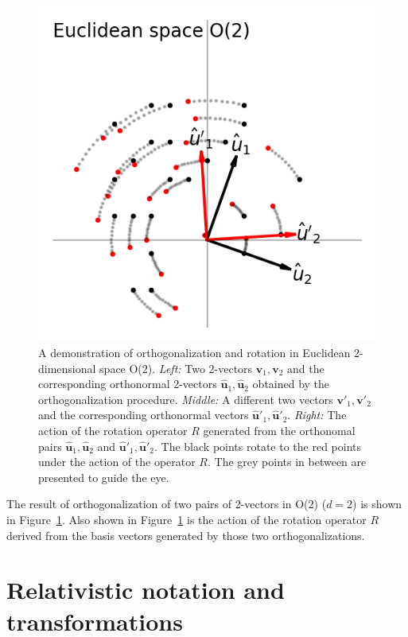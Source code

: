 \documentclass{article}
\newcommand{\Evec}[1]{{\mathbf{#1}}} %
\newcommand{\Ehat}[1]{{\mathbf{\hat{#1}}}} %
\newcommand{\figref}[1]{Figure~\ref{#1}}
\newlength{\figurewidth}
\begin{document}
\begin{figure}[t]
\begin{mdframed}
\includegraphics[width=\figurewidth]{E_Q.png}
\caption{A demonstration of orthogonalization and rotation in Euclidean 2-dimensional space O($2$).
    \textsl{Left:} Two 2-vectors $\Evec{v}_1, \Evec{v}_2$ and the corresponding orthonormal 2-vectors $\Ehat{u}_1, \Ehat{u}_2$ obtained by the orthogonalization procedure.
\textsl{Middle:} A different two vectors $\Evec{v}'_1, \Evec{v}'_2$ and the corresponding orthonormal vectors $\Ehat{u}'_1, \Ehat{u}'_2$.
\textsl{Right:} The action of the rotation operator $R$ generated from the orthonomal pairs $\Ehat{u}_1, \Ehat{u}_2$ and $\Ehat{u}'_1, \Ehat{u}'_2$.
The black points rotate to the red points under the action of the operator $R$.
The grey points in between are presented to guide the eye.\label{fig:Euclid}}
\end{mdframed}
\end{figure}
The result of orthogonalization of two pairs of 2-vectors in O($2$) ($d=2$) is shown in \figref{fig:Euclid}.
Also shown in \figref{fig:Euclid} is the action of the rotation operator $R$ derived from the basis vectors generated by those two orthogonalizations.

\section{Relativistic notation and transformations}\label{sec:notation}
\end{document}

